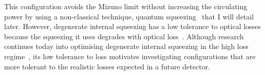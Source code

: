 This configuration avoids the Mizuno limit without increasing the circulating power by using a non-classical technique, quantum squeezing~\cite{miaoFundamentalQuantumLimit2017} that I will detail later. %
However, degenerate internal squeezing has a low tolerance to optical losses because the squeezing it uses degrades with optical loss~\cite{}. 
Although research continues today into optimising degenerate internal squeezing in the high loss regime~\cite{korobkoCompensatingQuantumDecoherenceTalk2021}, its low tolerance to loss motivates investigating configurations that are more tolerant to the realistic losses expected in a future detector. 

